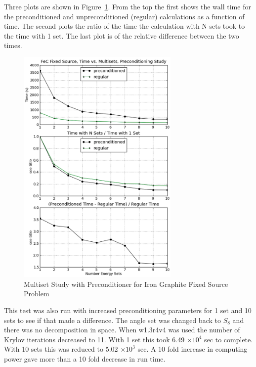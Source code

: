 Three plots are shown in Figure~\ref{fig:FeC multisets}. From the top the first shows the wall time for the preconditioned and unpreconditioned (regular) calculations as a function of time. The second plots the ratio of the time the calculation with N sets took to the time with 1 set. The last plot is of the relative difference between the two times.
%
\begin{figure}[!ht]
    \begin{center}
      \includegraphics [width=0.7\textwidth, height=0.8\textheight] {FeCmultisets}
   \end{center}
   \caption{Multiset Study with Preconditioner for Iron Graphite Fixed Source Problem}
   \label{fig:FeC multisets}
\end{figure}

This test was also run with increased preconditioning parameters for 1 set and 10 sets to see if that made a difference. The angle set was changed back to $S_{8}$ and there was no decomposition in space. When w1.3r4v4 was used the number of Krylov iterations decreased to 11. With 1 set this took 6.49 $\times 10^{4}$ sec to complete. With 10 sets this was reduced to 5.02 $\times 10^{3}$ sec. A 10 fold increase in computing power gave more than a 10 fold decrease in run time. 

